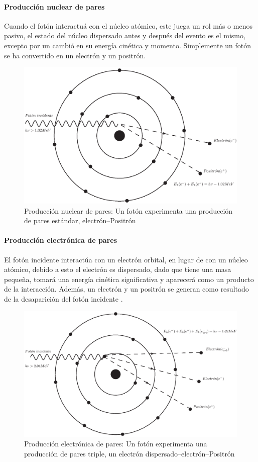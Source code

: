 \paragraph{Producción nuclear de pares}
 Cuando el fotón interactuá con el núcleo atómico, este juega un rol más o menos pasivo, el estado del núcleo dispersado antes y después del evento es el mismo, excepto por un cambió en su energía cinética y momento. Simplemente un fotón se ha convertido en un electrón y un positrón\cite{Edward}.
\begin{figure}[htbp]
    \centering
    \includegraphics[width=.71\linewidth]{./Figures/nuclearpp.eps}
    \caption[Producción nuclear de pares]{Producción nuclear de pares: Un fotón experimenta una producción de pares estándar, electrón--Positrón}
    \label{fig:PN}
\end{figure}
\paragraph{Producción electrónica de pares}
 El fotón incidente interactúa con un electrón orbital, en lugar de con un núcleo atómico, debido a esto el electrón es dispersado, dado que tiene una masa pequeña, tomará una energía cinética significativa y aparecerá como un producto de la interacción. Además, un electrón y un positrón se generan como resultado de la desaparición del fotón incidente \cite{Edward}.
\begin{figure}[htbp]
    \centering
    \includegraphics[width=.71\linewidth]{./Figures/electpp.eps}
    \caption[Producción electrónica de pares]{Producción electrónica de pares: Un fotón experimenta una producción de pares triple, un electrón dispersado--electrón--Positrón}
    \label{fig:PE}
\end{figure}

